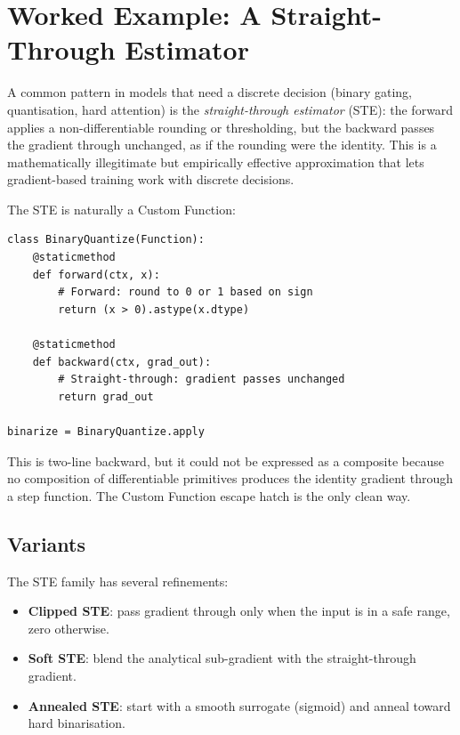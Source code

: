 \section{Worked Example: A Straight-Through Estimator}
\label{sec:custom_functions:ste_example}

A common pattern in models that need a discrete decision (binary
gating, quantisation, hard attention) is the \emph{straight-through
estimator} (STE): the forward applies a non-differentiable rounding
or thresholding, but the backward passes the gradient through
unchanged, as if the rounding were the identity. This is a
mathematically illegitimate but empirically effective approximation
that lets gradient-based training work with discrete decisions.

The STE is naturally a Custom Function:

\begin{lstlisting}[style=lucid,language=LucidPython]
class BinaryQuantize(Function):
    @staticmethod
    def forward(ctx, x):
        # Forward: round to 0 or 1 based on sign
        return (x > 0).astype(x.dtype)

    @staticmethod
    def backward(ctx, grad_out):
        # Straight-through: gradient passes unchanged
        return grad_out

binarize = BinaryQuantize.apply
\end{lstlisting}

This is two-line backward, but it could not be expressed as a
composite because no composition of differentiable primitives
produces the identity gradient through a step function. The Custom
Function escape hatch is the only clean way.

\subsection{Variants}
\label{ssec:custom_functions:ste_variants}

The STE family has several refinements:

\begin{itemize}
  \item \textbf{Clipped STE}: pass gradient through only when the
    input is in a safe range, zero otherwise.
  \item \textbf{Soft STE}: blend the analytical sub-gradient with
    the straight-through gradient.
  \item \textbf{Annealed STE}: start with a smooth surrogate
    (sigmoid) and anneal toward hard binarisation.
\end{itemize}

